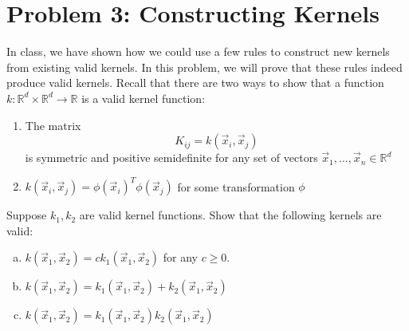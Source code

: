 \documentclass{article}
\begin{document}
	\section*{Problem 3: Constructing Kernels}
	In class, we have shown how we could use a few rules to construct new kernels from existing valid kernels. In this problem, we will prove that these rules indeed produce valid kernels. 
	\newline
	Recall that there are two ways to show that a function $k: \mathbb{R}^d \times \mathbb{R}^d \rightarrow \mathbb{R}$ is a valid kernel function:
    \begin{enumerate}
        \item The matrix $$K_{ij} = k(\vec{x}_i, \vec{x}_j)$$ is symmetric and positive semidefinite for any set of vectors $\vec{x}_1, ..., \vec{x}_n \in \mathbb{R}^d$
        \item $k(\vec{x}_i, \vec{x}_j) = \phi(\vec{x}_i)^T \phi(\vec{x}_j)$ for some transformation
        $\phi$
    \end{enumerate}
    Suppose $k_1, k_2$ are valid kernel functions. Show that the following kernels are valid: 
	\begin{enumerate}[(a)]
		\item $k(\vec{x}_1, \vec{x}_2) = c k_1(\vec{x}_1, \vec{x}_2)$ for any $c \geq 0$. 
		\item $k(\vec{x}_1, \vec{x}_2) = k_1(\vec{x}_1, \vec{x}_2) + k_2(\vec{x}_1, \vec{x}_2)$ 
		\item $k(\vec{x}_1, \vec{x}_2) = k_1(\vec{x}_1, \vec{x}_2) k_2(\vec{x}_1, \vec{x}_2)$ 
	\end{enumerate} 
\end{document}
